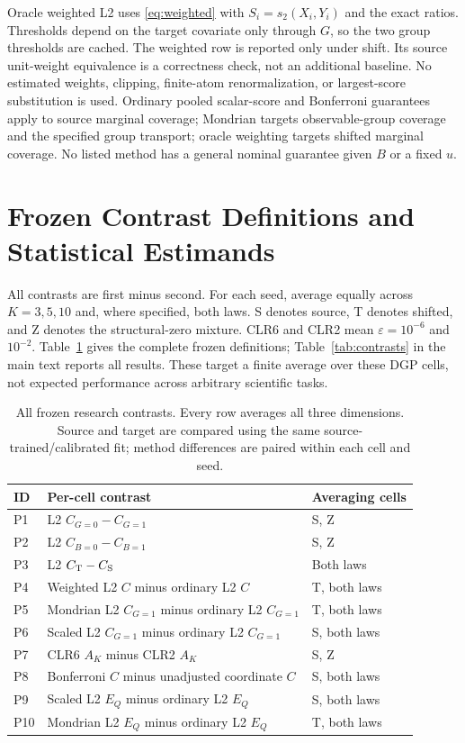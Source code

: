 \documentclass{article}
\theoremstyle{plain}
\begin{document}
Oracle weighted L2 uses \eqref{eq:weighted} with $S_i=s_2(X_i,Y_i)$ and the exact ratios. Thresholds depend on the target covariate only through $G$, so the two group thresholds are cached. The weighted row is reported only under shift. Its source unit-weight equivalence is a correctness check, not an additional baseline. No estimated weights, clipping, finite-atom renormalization, or largest-score substitution is used. Ordinary pooled scalar-score and Bonferroni guarantees apply to source marginal coverage; Mondrian targets observable-group coverage and the specified group transport; oracle weighting targets shifted marginal coverage. No listed method has a general nominal guarantee given $B$ or a fixed $u$.

\section{Frozen Contrast Definitions and Statistical Estimands}
\label{app:contrasts}
All contrasts are first minus second. For each seed, average equally across $K=3,5,10$ and, where specified, both laws. S denotes source, T denotes shifted, and Z denotes the structural-zero mixture. CLR6 and CLR2 mean $\varepsilon=10^{-6}$ and $10^{-2}$. Table~\ref{tab:definitions} gives the complete frozen definitions; Table~\ref{tab:contrasts} in the main text reports all results. These target a finite average over these DGP cells, not expected performance across arbitrary scientific tasks.

\begin{table}[htbp]
\caption{All frozen research contrasts. Every row averages all three dimensions. Source and target are compared using the same source-trained/calibrated fit; method differences are paired within each cell and seed.}
\label{tab:definitions}
\centering
\begin{tabular}{lll}
\toprule
ID & Per-cell contrast & Averaging cells \\
\midrule
P1 & L2 $C_{G=0}-C_{G=1}$ & S, Z \\
P2 & L2 $C_{B=0}-C_{B=1}$ & S, Z \\
P3 & L2 $C_{\rm T}-C_{\rm S}$ & Both laws \\
P4 & Weighted L2 $C$ minus ordinary L2 $C$ & T, both laws \\
P5 & Mondrian L2 $C_{G=1}$ minus ordinary L2 $C_{G=1}$ & T, both laws \\
P6 & Scaled L2 $C_{G=1}$ minus ordinary L2 $C_{G=1}$ & S, both laws \\
P7 & CLR6 $A_K$ minus CLR2 $A_K$ & S, Z \\
P8 & Bonferroni $C$ minus unadjusted coordinate $C$ & S, both laws \\
P9 & Scaled L2 $E_Q$ minus ordinary L2 $E_Q$ & S, both laws \\
P10 & Mondrian L2 $E_Q$ minus ordinary L2 $E_Q$ & T, both laws \\
\bottomrule
\end{tabular}
\end{table}
\end{document}
